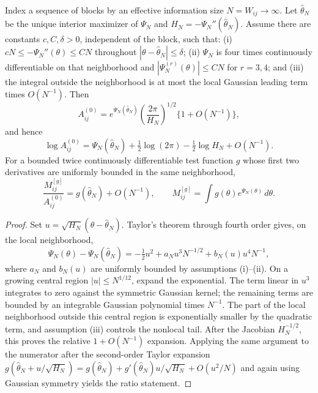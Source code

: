 \begin{theorem}
\label{thm:laplace}
Index a sequence of blocks by an effective information size $N=W_{ij}\to\infty$. Let
$\widehat\theta_N$ be the unique interior maximizer of $\Psi_N$ and
$H_N=-\Psi_N''(\widehat\theta_N)$. Assume there are constants $c,C,\delta>0$, independent of the
block, such that: (i) $cN\le-\Psi_N''(\theta)\le CN$ throughout
$|\theta-\widehat\theta_N|\le\delta$; (ii) $\Psi_N$ is four times continuously differentiable on
that neighborhood and $|\Psi_N^{(r)}(\theta)|\le CN$ for $r=3,4$; and (iii) the integral outside
the neighborhood is at most the local Gaussian leading term times $O(N^{-1})$. Then
\begin{equation}
 A^{(0)}_{ij}=e^{\Psi_N(\widehat\theta_N)}
 \left(\frac{2\pi}{H_N}\right)^{1/2}\{1+O(N^{-1})\},
\label{eq:laplace-A0-mult}
\end{equation}
and hence
\begin{equation}
 \log A^{(0)}_{ij}=\Psi_N(\widehat\theta_N)+\tfrac12\log(2\pi)-\tfrac12\log H_N+O(N^{-1}).
\label{eq:laplace-A0}
\end{equation}
For a bounded twice continuously differentiable test function $g$ whose first two derivatives are uniformly bounded in the same neighborhood,
\begin{equation}
 \frac{M^{[g]}_{ij}}{A^{(0)}_{ij}}=g(\widehat\theta_N)+O(N^{-1}),
\qquad M^{[g]}_{ij}=\int g(\theta)e^{\Psi_N(\theta)}\,d\theta.
\label{eq:laplace-moment}
\end{equation}
\end{theorem}
\begin{proof}
Set $u=\sqrt{H_N}(\theta-\widehat\theta_N)$. Taylor's theorem through fourth order gives, on the
local neighborhood,
\[
 \Psi_N(\theta)-\Psi_N(\widehat\theta_N)
 =-\tfrac12u^2+a_Nu^3N^{-1/2}+b_N(u)u^4N^{-1},
\]
where $a_N$ and $b_N(u)$ are uniformly bounded by assumptions (i)--(ii). On a growing central
region $|u|\le N^{1/12}$, expand the exponential. The term linear in $u^3$ integrates to zero
against the symmetric Gaussian kernel; the remaining terms are bounded by an integrable Gaussian
polynomial times $N^{-1}$. The part of the local neighborhood outside this central region is
exponentially smaller by the quadratic term, and assumption (iii) controls the nonlocal tail.
After the Jacobian $H_N^{-1/2}$, this proves the relative $1+O(N^{-1})$ expansion. Applying the
same argument to the numerator after the second-order Taylor expansion
$g(\widehat\theta_N+u/\sqrt{H_N})=g(\widehat\theta_N)+g'(\widehat\theta_N)u/\sqrt{H_N}+O(u^2/N)$
and again using Gaussian symmetry yields the ratio statement.
\end{proof}


